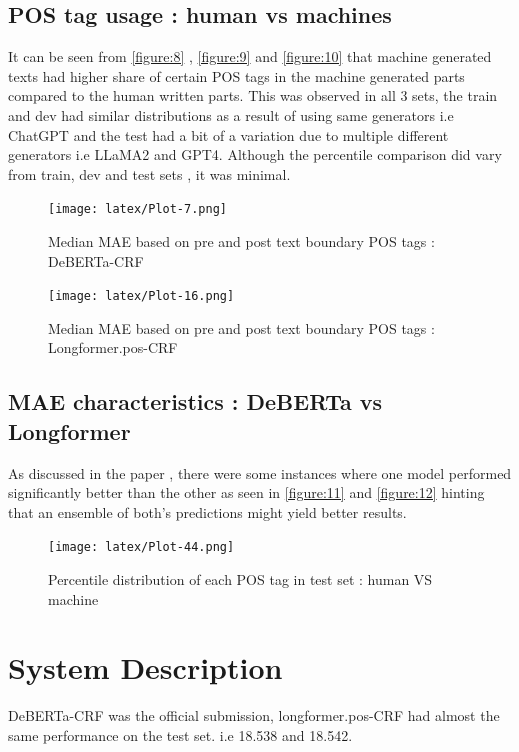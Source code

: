 \documentclass[11pt]{article}
\begin{document}
\subsection{POS tag usage : human vs machines}
\label{sec:appendix_A}
It can be seen from \autoref{figure:8} , \autoref{figure:9} and \autoref{figure:10} that machine generated texts had higher share of certain POS tags in the machine generated parts compared to the human written parts. This was observed in all 3 sets, the train and dev had  similar distributions as a result of using same generators i.e ChatGPT and the test had a bit of a variation due to multiple different generators i.e LLaMA2 and GPT4. Although the percentile comparison did vary from train, dev and test sets , it was minimal.

\begin{figure}[ht]
\centering
\texttt{[image: latex/Plot-7.png]}
\caption{Median MAE based on pre and post text boundary POS tags : DeBERTa-CRF}
\label{figure:11}
\end{figure}
\begin{figure}[ht]
\centering
\texttt{[image: latex/Plot-16.png]}
\caption{Median MAE based on pre and post text boundary POS tags : Longformer.pos-CRF}
\label{figure:12}
\end{figure}

\subsection{MAE characteristics : DeBERTa vs Longformer}
\label{sec:appendix_A2}
As discussed in the paper , there were some instances where one model performed significantly better than the other as seen in \autoref{figure:11} and \autoref{figure:12} hinting that an ensemble of both's predictions might yield better results. 

\begin{figure}[]
\centering
\texttt{[image: latex/Plot-44.png]}
\caption{Percentile distribution of each POS tag in test set : human VS machine}
\label{figure:10}
\end{figure}

\section{System Description}
DeBERTa-CRF was the official submission, longformer.pos-CRF had almost the same performance on the test set. i.e 18.538 and 18.542.
\label{sec:appendix_C}
\\
\end{document}
